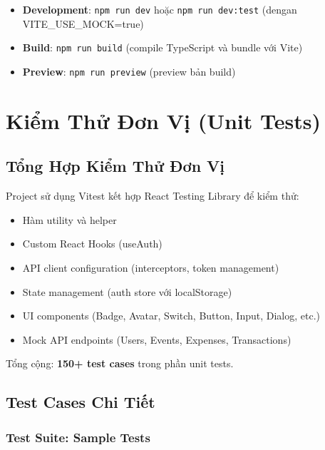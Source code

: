 \documentclass[12pt,a4paper,vietnamese]{article}
\begin{document}
\begin{itemize}
    \item \textbf{Development}: \texttt{npm run dev} hoặc \texttt{npm run dev:test} (dengan VITE\_USE\_MOCK=true)
    \item \textbf{Build}: \texttt{npm run build} (compile TypeScript và bundle với Vite)
    \item \textbf{Preview}: \texttt{npm run preview} (preview bản build)
\end{itemize}


\section{Kiểm Thử Đơn Vị (Unit Tests)}

\subsection{Tổng Hợp Kiểm Thử Đơn Vị}

Project sử dụng Vitest kết hợp React Testing Library để kiểm thử:
\begin{itemize}
    \item Hàm utility và helper
    \item Custom React Hooks (useAuth)
    \item API client configuration (interceptors, token management)
    \item State management (auth store với localStorage)
    \item UI components (Badge, Avatar, Switch, Button, Input, Dialog, etc.)
    \item Mock API endpoints (Users, Events, Expenses, Transactions)
\end{itemize}

Tổng cộng: \textbf{150+ test cases} trong phần unit tests.

\subsection{Test Cases Chi Tiết}

\subsubsection{Test Suite: Sample Tests}
\end{document}

